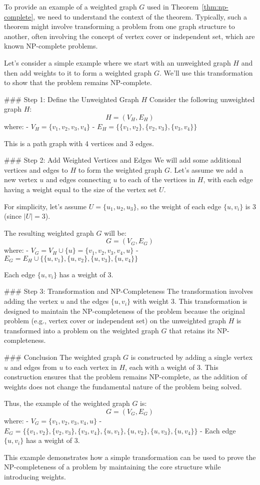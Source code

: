 To provide an example of a weighted graph \( G \) used in Theorem~\ref{thm:np-complete}, we need to understand the context of the theorem. Typically, such a theorem might involve transforming a problem from one graph structure to another, often involving the concept of vertex cover or independent set, which are known NP-complete problems.

Let's consider a simple example where we start with an unweighted graph \( H \) and then add weights to it to form a weighted graph \( G \). We'll use this transformation to show that the problem remains NP-complete.

### Step 1: Define the Unweighted Graph \( H \)
Consider the following unweighted graph \( H \):
\[ H = (V_H, E_H) \]
where:
- \( V_H = \{v_1, v_2, v_3, v_4\} \)
- \( E_H = \{\{v_1, v_2\}, \{v_2, v_3\}, \{v_3, v_4\}\} \)

This is a path graph with 4 vertices and 3 edges.

### Step 2: Add Weighted Vertices and Edges
We will add some additional vertices and edges to \( H \) to form the weighted graph \( G \). Let's assume we add a new vertex \( u \) and edges connecting \( u \) to each of the vertices in \( H \), with each edge having a weight equal to the size of the vertex set \( U \).

For simplicity, let's assume \( U = \{u_1, u_2, u_3\} \), so the weight of each edge \( \{u, v_i\} \) is 3 (since \( |U| = 3 \)).

The resulting weighted graph \( G \) will be:
\[ G = (V_G, E_G) \]
where:
- \( V_G = V_H \cup \{u\} = \{v_1, v_2, v_3, v_4, u\} \)
- \( E_G = E_H \cup \{\{u, v_1\}, \{u, v_2\}, \{u, v_3\}, \{u, v_4\}\} \)

Each edge \( \{u, v_i\} \) has a weight of 3.

### Step 3: Transformation and NP-Completeness
The transformation involves adding the vertex \( u \) and the edges \( \{u, v_i\} \) with weight 3. This transformation is designed to maintain the NP-completeness of the problem because the original problem (e.g., vertex cover or independent set) on the unweighted graph \( H \) is transformed into a problem on the weighted graph \( G \) that retains its NP-completeness.

### Conclusion
The weighted graph \( G \) is constructed by adding a single vertex \( u \) and edges from \( u \) to each vertex in \( H \), each with a weight of 3. This construction ensures that the problem remains NP-complete, as the addition of weights does not change the fundamental nature of the problem being solved.

Thus, the example of the weighted graph \( G \) is:
\[ G = (V_G, E_G) \]
where:
- \( V_G = \{v_1, v_2, v_3, v_4, u\} \)
- \( E_G = \{\{v_1, v_2\}, \{v_2, v_3\}, \{v_3, v_4\}, \{u, v_1\}, \{u, v_2\}, \{u, v_3\}, \{u, v_4\}\} \)
- Each edge \( \{u, v_i\} \) has a weight of 3.

This example demonstrates how a simple transformation can be used to prove the NP-completeness of a problem by maintaining the core structure while introducing weights.
